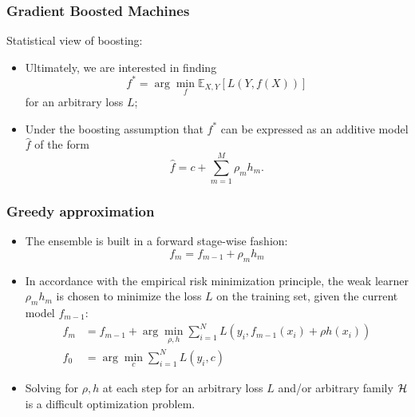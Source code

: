 \documentclass{beamer}
\begin{document}
\begin{frame}
  \frametitle{Gradient Boosted Machines \citep{friedman:2001}}

  Statistical view of boosting:

  \begin{itemize}
      \item Ultimately, we are interested in finding
      $$f^* = \arg \min_f \mathbb{E}_{X,Y} [L(Y,f(X))]$$
      for an arbitrary loss $L$;
      \item Under the boosting assumption that $f^*$ can be expressed as an additive model $\hat{f}$ of the form
      $$\hat{f} =  c + \sum_{m=1}^M \rho_m h_m.$$
  \end{itemize}

\end{frame}


\begin{frame}
  \frametitle{Greedy approximation}

  \begin{itemize}
      \item The ensemble is built in a forward stage-wise fashion:
      $$f_m = f_{m-1} + \rho_m h_m$$
      \item In accordance with the empirical risk minimization principle,
      the weak learner $\rho_m h_m$ is chosen to minimize the
      loss $L$ on the training set, given the current model $f_{m-1}$:
      \begin{align*}
          f_m & = f_{m-1} + \arg \min_{\rho,h} \sum_{i=1}^N L(y_i, f_{m-1}(x_i) + \rho h(x_i)) \\
          f_0 &= \arg \min_c\sum_{i=1}^N L(y_i, c)
      \end{align*}
      \item Solving for $\rho, h$ at each step for an arbitrary loss $L$
      and/or arbitrary family ${\cal H}$  is a difficult optimization problem.
  \end{itemize}

\end{frame}
\end{document}
